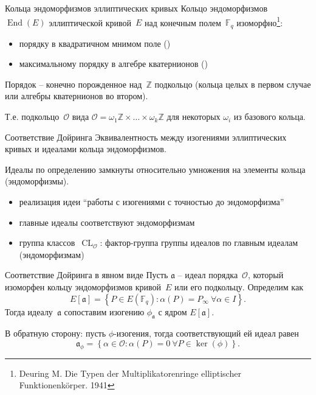 \documentclass{beamer}
\begin{document}
\begin{frame}{Кольца эндоморфизмов эллиптических кривых}
Кольцо эндоморфизмов~$\operatorname{End}(E)$ эллиптической кривой~$E$ над конечным полем~$\mathbb{F}_q$ изоморфно\footnote{\scriptsize Deuring M. Die Typen der Multiplikatorenringe elliptischer Funktionenkörper. 1941}:
\begin{itemize}
	\item порядку в квадратичном мнимом поле ()
	\item максимальному порядку в алгебре кватернионов ()
\end{itemize}

\vspace{0.5em}
Порядок -- конечно порожденное над~$\mathbb{Z}$ подкольцо (кольца целых в первом случае или алгебры кватернионов во втором).

\vspace{0.5em}
Т.е. подкольцо~$\mathcal{O}$ вида $\mathcal{O} = \omega_1 \mathbb{Z} \times \ldots \times \omega_k \mathbb{Z}$ для некоторых $\omega_i$ из базового кольца.
\end{frame}

\begin{frame}{Соответствие Дойринга}
Эквивалентность между изогениями эллиптических кривых и идеалами кольца эндоморфизмов.

\vspace{0.5em}

Идеалы по определению замкнуты относительно умножения на элементы кольца (эндоморфизмы).
\begin{itemize}
	\item реализация идеи ``работы с изогениями с точностью до эндоморфизма''
	\item главные идеалы соответствуют эндоморфизмам
	\item группа классов~$\operatorname{CL}_\mathcal{O}$: фактор-группа группы идеалов по главным идеалам (эндоморфизмам) 
\end{itemize}
\end{frame}

\begin{frame}{Соответствие Дойринга в явном виде}
Пусть $\mathfrak{a}$ -- идеал порядка~$\mathcal{O}$, который изоморфен кольцу эндоморфизмов кривой~$E$ или его подкольцу. Определим  как
\[
E[\mathfrak{a}] = \left\{P \in E(\mathbb{F}_q): \alpha(P) = P_\infty~\forall \alpha \in I \right\}.
\]
Тогда идеалу~$\mathfrak{a}$ сопоставим изогению  $\phi_\mathfrak{a}$ с ядром $E[\mathfrak{a}]$.
\vspace{0.5em}

В обратную сторону: пусть $\phi$-изогения, тогда соответствующий ей идеал равен
\[
\mathfrak{a}_\phi = \left\{ \alpha \in \mathcal{O}: \alpha(P) = 0 ~\forall P \in \ker(\phi) \right\}.
\]
\end{frame}
\end{document}
